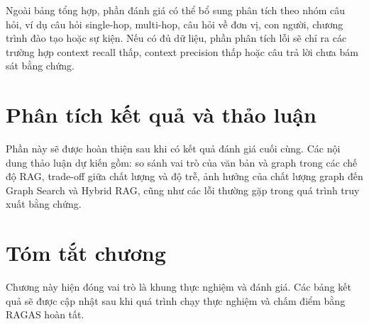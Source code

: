 Ngoài bảng tổng hợp, phần đánh giá có thể bổ sung phân tích theo nhóm câu hỏi, ví dụ câu hỏi single-hop, multi-hop, câu hỏi về đơn vị, con người, chương trình đào tạo hoặc sự kiện. Nếu có đủ dữ liệu, phần phân tích lỗi sẽ chỉ ra các trường hợp context recall thấp, context precision thấp hoặc câu trả lời chưa bám sát bằng chứng.

\section{Phân tích kết quả và thảo luận}

Phần này sẽ được hoàn thiện sau khi có kết quả đánh giá cuối cùng. Các nội dung thảo luận dự kiến gồm: so sánh vai trò của văn bản và graph trong các chế độ RAG, trade-off giữa chất lượng và độ trễ, ảnh hưởng của chất lượng graph đến Graph Search và Hybrid RAG, cũng như các lỗi thường gặp trong quá trình truy xuất bằng chứng.

\section{Tóm tắt chương}

Chương này hiện đóng vai trò là khung thực nghiệm và đánh giá. Các bảng kết quả sẽ được cập nhật sau khi quá trình chạy thực nghiệm và chấm điểm bằng RAGAS hoàn tất.
